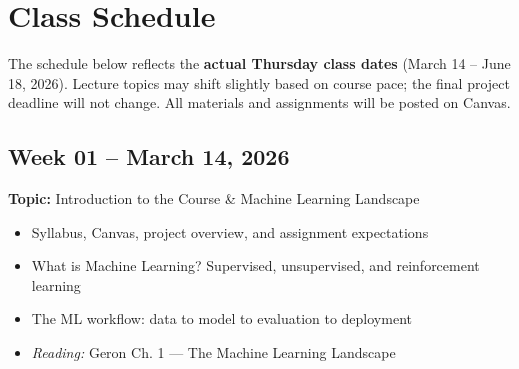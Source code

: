 \documentclass[
  10pt,
]{article}
\providecommand{\tightlist}{%
  \setlength{\itemsep}{0pt}\setlength{\parskip}{0pt}}
\newenvironment{blackbox}{%
  \def\FrameCommand{%
    \hspace{1pt}%
    {\color{boxborder}\vrule width 2pt}%
    {\color{boxbg}\vrule width 4pt}%
    \colorbox{boxbg}%
  }%
  \MakeFramed{\advance\hsize-\width\FrameRestore}%
  \noindent\ignorespaces
}{%
  \endMakeFramed
}
\begin{document}
\section*{Class Schedule}\label{class-schedule}

The schedule below reflects the \textbf{actual Thursday class dates}
(March 14 -- June 18, 2026). Lecture topics may shift slightly based on
course pace; the final project deadline will not change. All materials
and assignments will be posted on Canvas.

\begin{blackbox}

\begin{center}

\subsection{Week 01 -- March 14, 2026}\label{week-01-march-14-2026}

\end{center}

\textbf{Topic:} Introduction to the Course \& Machine Learning Landscape

\begin{itemize}
\tightlist
\item
  Syllabus, Canvas, project overview, and assignment expectations
\item
  What is Machine Learning? Supervised, unsupervised, and reinforcement
  learning
\item
  The ML workflow: data to model to evaluation to deployment
\item
  \emph{Reading:} Geron Ch. 1 --- The Machine Learning Landscape
\end{itemize}

\end{blackbox}
\end{document}
